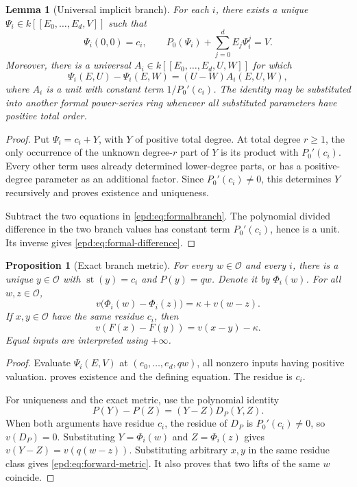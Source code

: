 \documentclass[11pt,a4paper]{article}
\numberwithin{equation}{section}
\theoremstyle{plain}
\newtheorem{proposition}[proposition]{Proposition}
\newtheorem{lemma}[lemma]{Lemma}
\theoremstyle{definition}
\theoremstyle{remark}
\newcommand{\OO}{\mathcal O}
\newcommand{\st}{\operatorname{st}}
\begin{document}
\begin{lemma}[Universal implicit branch]\label{epd:lem:formalbranch}
For each $i$, there exists a unique
$\Psi_i\in k[[E_0,\ldots,E_d,V]]$ such that
\begin{equation}\label{epd:eq:formalbranch}
 \Psi_i(0,0)=c_i,
 \qquad
 P_0(\Psi_i)+\sum_{j=0}^dE_j\Psi_i^j=V.
\end{equation}
Moreover, there is a universal
$A_i\in k[[E_0,\ldots,E_d,U,W]]$ for which
\begin{equation}\label{epd:eq:formal-difference}
 \Psi_i(E,U)-\Psi_i(E,W)=(U-W)A_i(E,U,W),
\end{equation}
where $A_i$ is a unit with constant term $1/P_0'(c_i)$.
The identity may be substituted into another formal power-series ring
whenever all substituted parameters have positive total order.
\end{lemma}
\begin{proof}
Put $\Psi_i=c_i+Y$, with $Y$ of positive total degree. At total degree
$r\geq1$, the only occurrence of the unknown degree-$r$ part of $Y$
is its product with $P_0'(c_i)$. Every other term uses already determined
lower-degree parts, or has a positive-degree parameter as an additional
factor. Since $P_0'(c_i)\ne0$, this determines $Y$ recursively and proves
existence and uniqueness.

Subtract the two equations in \eqref{epd:eq:formalbranch}. The polynomial
divided difference in the two branch values has constant term
$P_0'(c_i)$, hence is a unit. Its inverse gives
\eqref{epd:eq:formal-difference}.
\end{proof}

\begin{proposition}[Exact branch metric]\label{epd:prop:branches}
For every $w\in\OO$ and every $i$, there is a unique $y\in\OO$ with
$\st(y)=c_i$ and $P(y)=qw$. Denote it by $\Phi_i(w)$. For all
$w,z\in\OO$,
\begin{equation}\label{epd:eq:branch-metric}
 v\bigl(\Phi_i(w)-\Phi_i(z)\bigr)=\kappa+v(w-z).
\end{equation}
If $x,y\in\OO$ have the same residue $c_i$, then
\begin{equation}\label{epd:eq:forward-metric}
 v(F(x)-F(y))=v(x-y)-\kappa.
\end{equation}
Equal inputs are interpreted using $+\infty$.
\end{proposition}
\begin{proof}
Evaluate $\Psi_i(E,V)$ at $(e_0,\ldots,e_d,qw)$, all nonzero inputs
having positive valuation.  proves existence and
the defining equation. The residue is $c_i$.

For uniqueness and the exact metric, use the polynomial identity
\[
 P(Y)-P(Z)=(Y-Z)D_P(Y,Z).
\]
When both arguments have residue $c_i$, the residue of $D_P$ is
$P_0'(c_i)\ne0$, so $v(D_P)=0$. Substituting $Y=\Phi_i(w)$ and
$Z=\Phi_i(z)$ gives
$v(Y-Z)=v(q(w-z))$. Substituting arbitrary $x,y$ in the same residue
class gives \eqref{epd:eq:forward-metric}. It also proves that two lifts of
the same $w$ coincide.
\end{proof}
\end{document}
